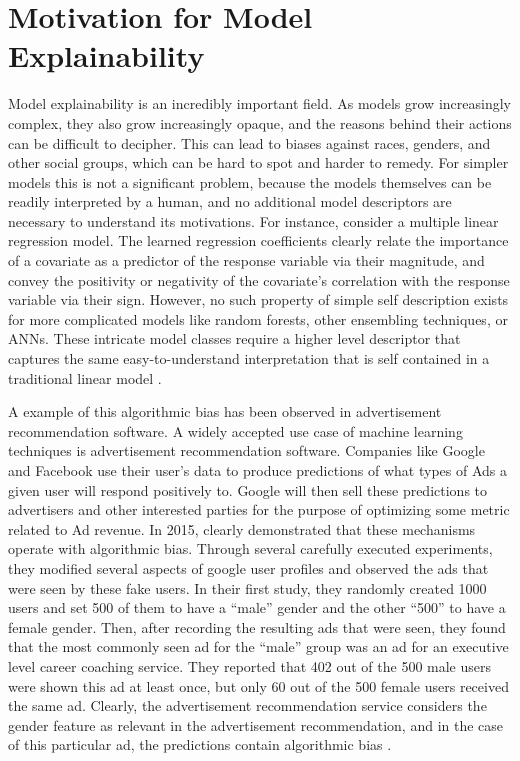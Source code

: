 \section{Motivation for Model Explainability}

Model explainability is an incredibly important field. As models grow increasingly complex, they also grow increasingly opaque, and the reasons behind their actions can be difficult to decipher. This can lead to biases against races, genders, and other social groups, which can be hard to spot and harder to remedy. For simpler models this is not a significant problem, because the models themselves can be readily interpreted by a human, and no additional model descriptors are necessary to understand its motivations. For instance, consider a multiple linear regression model. The learned regression coefficients clearly relate the importance of a covariate as a predictor of the response variable via their magnitude, and convey the positivity or negativity of the covariate's correlation with the response variable via their sign. However, no such property of simple self description exists for more complicated models like random forests, other ensembling techniques, or ANNs. These intricate model classes require a higher level descriptor that captures the same easy-to-understand interpretation that is self contained in a traditional linear model \citep{microsoftPaper}. 


A example of this algorithmic bias has been observed in advertisement recommendation software. A widely accepted use case of machine learning techniques is advertisement recommendation software. Companies like Google and Facebook use their user’s data to produce predictions of what types of Ads a given user will respond positively to.  Google will then sell these predictions to advertisers and other interested parties for the purpose of optimizing some metric related to Ad revenue.  In 2015, \citet{adfisher} clearly demonstrated that these mechanisms operate with algorithmic bias.  Through several carefully executed experiments, they modified several aspects of google user profiles and observed the ads that were seen by these fake users.  In their first study, they randomly created 1000 users and set 500 of them to have a “male” gender and the other “500” to have a female gender. Then, after recording the resulting ads that were seen, they found that the most commonly seen ad for the “male” group was an ad for an executive level career coaching service. They reported that 402 out of the 500 male users were shown this ad at least once, but only 60 out of the 500 female users received the same ad. Clearly, the advertisement recommendation service considers the gender feature as relevant in the advertisement recommendation, and in the case of this particular ad, the predictions contain algorithmic bias \citep{adfisher}. 